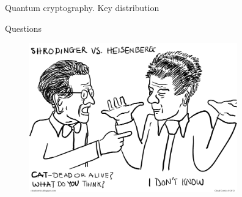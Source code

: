 \documentclass[10pt,pdf,hyperref={unicode}]{beamer}
\begin{document}
\begin{frame}{Quantum cryptography. Key distribution}
 \begin{figure} 
   
 \end{figure}
\end{frame}


\begin{frame}{Questions}
 \begin{figure} 
   \includegraphics[width=90mm,scale=0.5]{questions.png}
  \end{figure}
\end{frame}
\end{document}
